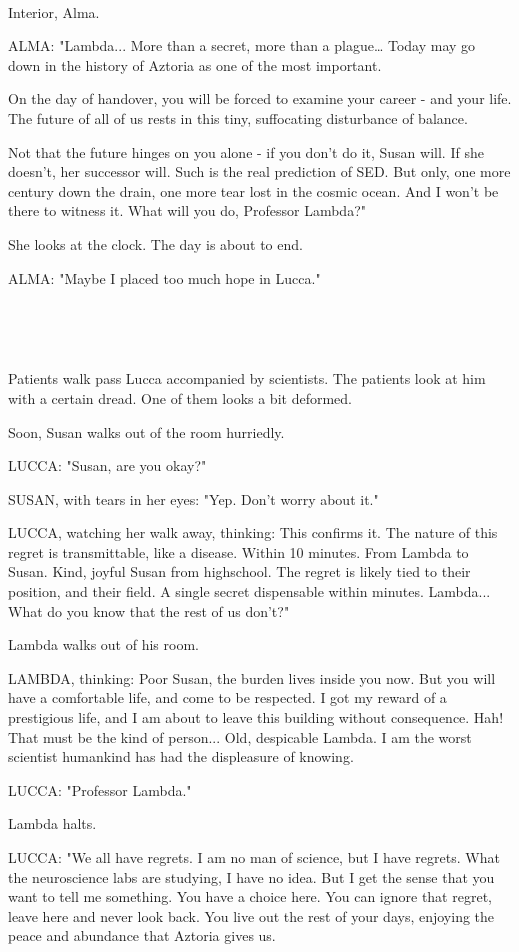 \documentclass[11pt]{article}
\begin{document}
\ 

Interior, Alma.

ALMA: 
"Lambda... More than a secret, more than a plague… Today may go down in the history of Aztoria as one of the most important. 

On the day of handover, you will be forced to examine your career - and your life. The future of all of us rests in this tiny, suffocating disturbance of balance. 

Not that the future hinges on you alone - if you don’t do it, Susan will. If she doesn’t, her successor will. Such is the real prediction of SED. But only, one more century down the drain, one more tear lost in the cosmic ocean. And I won’t be there to witness it. What will you do, Professor Lambda?"

She looks at the clock. The day is about to end.

ALMA: "Maybe I placed too much hope in Lucca."

\ 

\ 

Patients walk pass Lucca accompanied by scientists.
The patients look at him with a certain dread.
One of them looks a bit deformed.

Soon, Susan walks out of the room hurriedly.

LUCCA: "Susan, are you okay?"

SUSAN, with tears in her eyes: "Yep. Don't worry about it."

LUCCA, watching her walk away, thinking: This confirms it. 
The nature of this regret is transmittable, like a disease.
Within 10 minutes. 
From Lambda to Susan.
Kind, joyful Susan from highschool.
The regret is likely tied to their position, and their field.
A single secret dispensable within minutes.
Lambda... What do you know that the rest of us don't?"

Lambda walks out of his room. 

LAMBDA, thinking: 
Poor Susan, the burden lives inside you now.
But you will have a comfortable life, and come to be respected.
I got my reward of a prestigious life, and I am about to leave this building without consequence.
Hah! That must be the kind of person...
Old, despicable Lambda.
I am the worst scientist humankind has had the displeasure of knowing.

LUCCA: "Professor Lambda."

Lambda halts.

LUCCA: "We all have regrets.
I am no man of science, but I have regrets.
What the neuroscience labs are studying, I have no idea.
But I get the sense that you want to tell me something.
You have a choice here.
You can ignore that regret, leave here and never look back.
You live out the rest of your days, enjoying the peace and abundance that Aztoria gives us.
\end{document}
